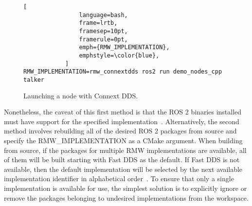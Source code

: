     \begin{figure}[thbp]
        \centering
            \begin{lstlisting}[
                language=bash,
                frame=lrtb,
                framesep=10pt,
                framerule=0pt,
                emph={RMW_IMPLEMENTATION},
                emphstyle=\color{blue},
            ]
RMW_IMPLEMENTATION=rmw_connextdds ros2 run demo_nodes_cpp talker
\end{lstlisting}
        \caption{Launching a node with Connext \ac{DDS}.}
        \label{fig:envrmw}
    \end{figure}

    Nonetheless, the caveat of this first method is that the \ac{ROS} 2 binaries installed must have support for the specified implementation~\cite{subrmw}. Alternatively, the second method involves rebuilding all of the desired \ac{ROS} 2 packages from source and specify the \small\textsf{RMW\_IMPLEMENTATION} as a CMake argument. When building from source, if the packages for multiple \ac{RMW} implementations are available, all of them will be built starting with Fast \ac{DDS} as the default. If Fast \ac{DDS} is not available, then the default implementation will be selected by the next available implementation identifier in alphabetical order~\cite{docsdds}. To ensure that only a single implementation is available for use, the simplest solution is to explicitly ignore or remove the packages belonging to undesired implementations from the workspace.

